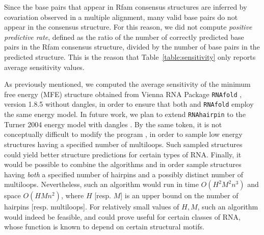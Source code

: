Since the base pairs that appear in Rfam consensus structures are
inferred by covariation observed in a multiple alignment,
many valid base pairs do not appear in the consensus structure. For
this reason, we did not compute {\em positive predictive rate}, defined
as the ratio of the number of correctly predicted base pairs in the
Rfam consensus structure, divided by the number of base pairs in the
predicted structure. This is the reason that Table~\ref{table:sensitivity}
only reports average sensitivity values.

As previously mentioned, we computed the average sensitivity of
the minimum free energy (MFE) structure obtained from Vienna RNA
Package {\tt RNAfold} \cite{hofacker:ViennaWebServer}, version 1.8.5
without dangles, in order to ensure that both {\rnahairpin} and {\tt RNAfold}
employ the same energy model.  In future work, we plan
to extend {\tt RNAhairpin} to the Turner 2004 energy model with dangles
\cite{Turner.nar09}. By the same token, it is not conceptually difficult
to modify the program {\rnamlnumber}, in order to sample low energy structures
having a specified number of multiloops. Such sampled structures could
yield better structure predictions for certain types of RNA. Finally,
it would be possible to combine the algorithms {\rnahairpin} and {\rnamlnumber}
in order sample structures having {\em both} a specified number of hairpins
and a possibly distinct number of multiloops. Nevertheless, such an
algorithm would run in time $O(H^2 M^2 n^3)$ and space $O(H M n^2)$,
where $H$ [resp. $M$] is an upper bound on the number of hairpins
[resp. multiloops]. For relatively small values of $H,M$, such an
algorithm would indeed be feasible, and could prove useful for certain
classes of RNA, whose function is known to depend on certain structural
motifs.

